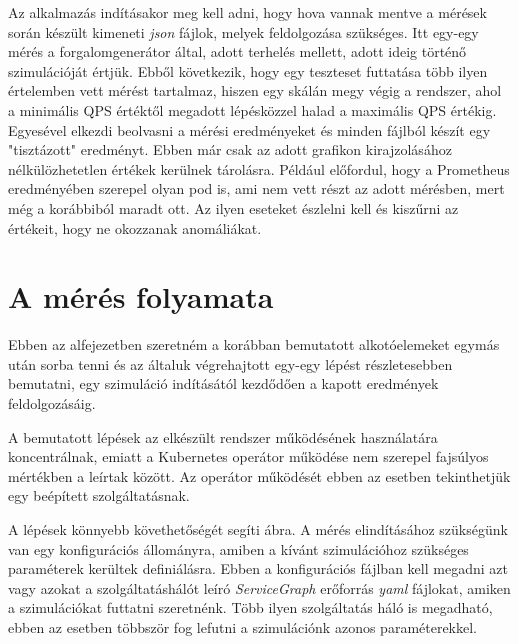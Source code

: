%

Az alkalmazás indításakor meg kell adni, hogy hova vannak mentve a mérések során készült kimeneti \textit{json} fájlok, melyek feldolgozása szükséges.
Itt egy-egy mérés a forgalomgenerátor által, adott terhelés mellett, adott ideig történő szimulációját értjük.
Ebből következik, hogy egy teszteset futtatása több ilyen értelemben vett mérést tartalmaz, hiszen egy skálán megy végig a rendszer, ahol a minimális QPS értéktől megadott lépésközzel halad a maximális QPS értékig. 
Egyesével elkezdi beolvasni a mérési eredményeket és minden fájlból készít egy "tisztázott" eredményt.
Ebben már csak az adott grafikon kirajzolásához nélkülözhetetlen értékek kerülnek tárolásra.
Például előfordul, hogy a Prometheus eredményében szerepel olyan pod is, ami nem vett részt az adott mérésben, mert még a korábbiból maradt ott.
Az ilyen eseteket észlelni kell és kiszűrni az értékeit, hogy ne okozzanak anomáliákat. 

\section{A mérés folyamata}
\label{sec:measure_steps}

Ebben az alfejezetben szeretném a korábban bemutatott alkotóelemeket egymás után sorba tenni és az általuk végrehajtott egy-egy lépést részletesebben bemutatni, egy szimuláció indításától kezdődően a kapott eredmények feldolgozásáig.

A bemutatott lépések az elkészült rendszer működésének használatára koncentrálnak, emiatt a Kubernetes operátor működése nem szerepel fajsúlyos mértékben a leírtak között.
Az operátor működését ebben az esetben tekinthetjük egy beépített szolgáltatásnak.

A lépések könnyebb követhetőségét segíti  ábra.
A mérés elindításához szükségünk van egy konfigurációs állományra, amiben a kívánt szimulációhoz szükséges paraméterek kerültek definiálásra.
Ebben a konfigurációs fájlban kell megadni azt vagy azokat a szolgáltatáshálót leíró \textit{ServiceGraph} erőforrás \textit{yaml} fájlokat, amiken a szimulációkat futtatni szeretnénk.
Több ilyen szolgáltatás háló is megadható, ebben az esetben többször fog lefutni a szimulációnk azonos paraméterekkel.

